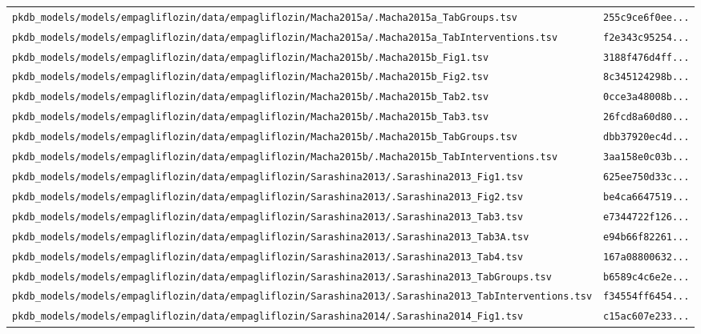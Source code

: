 \documentclass{article}
\begin{document}
\begin{longtable}{ll}
\texttt{pkdb\_models/models/empagliflozin/data/empagliflozin/Macha2015a/.Macha2015a\_TabGroups.tsv} & \texttt{255c9ce6f0ee...} \\
\texttt{pkdb\_models/models/empagliflozin/data/empagliflozin/Macha2015a/.Macha2015a\_TabInterventions.tsv} & \texttt{f2e343c95254...} \\
\texttt{pkdb\_models/models/empagliflozin/data/empagliflozin/Macha2015b/.Macha2015b\_Fig1.tsv} & \texttt{3188f476d4ff...} \\
\texttt{pkdb\_models/models/empagliflozin/data/empagliflozin/Macha2015b/.Macha2015b\_Fig2.tsv} & \texttt{8c345124298b...} \\
\texttt{pkdb\_models/models/empagliflozin/data/empagliflozin/Macha2015b/.Macha2015b\_Tab2.tsv} & \texttt{0cce3a48008b...} \\
\texttt{pkdb\_models/models/empagliflozin/data/empagliflozin/Macha2015b/.Macha2015b\_Tab3.tsv} & \texttt{26fcd8a60d80...} \\
\texttt{pkdb\_models/models/empagliflozin/data/empagliflozin/Macha2015b/.Macha2015b\_TabGroups.tsv} & \texttt{dbb37920ec4d...} \\
\texttt{pkdb\_models/models/empagliflozin/data/empagliflozin/Macha2015b/.Macha2015b\_TabInterventions.tsv} & \texttt{3aa158e0c03b...} \\
\texttt{pkdb\_models/models/empagliflozin/data/empagliflozin/Sarashina2013/.Sarashina2013\_Fig1.tsv} & \texttt{625ee750d33c...} \\
\texttt{pkdb\_models/models/empagliflozin/data/empagliflozin/Sarashina2013/.Sarashina2013\_Fig2.tsv} & \texttt{be4ca6647519...} \\
\texttt{pkdb\_models/models/empagliflozin/data/empagliflozin/Sarashina2013/.Sarashina2013\_Tab3.tsv} & \texttt{e7344722f126...} \\
\texttt{pkdb\_models/models/empagliflozin/data/empagliflozin/Sarashina2013/.Sarashina2013\_Tab3A.tsv} & \texttt{e94b66f82261...} \\
\texttt{pkdb\_models/models/empagliflozin/data/empagliflozin/Sarashina2013/.Sarashina2013\_Tab4.tsv} & \texttt{167a08800632...} \\
\texttt{pkdb\_models/models/empagliflozin/data/empagliflozin/Sarashina2013/.Sarashina2013\_TabGroups.tsv} & \texttt{b6589c4c6e2e...} \\
\texttt{pkdb\_models/models/empagliflozin/data/empagliflozin/Sarashina2013/.Sarashina2013\_TabInterventions.tsv} & \texttt{f34554ff6454...} \\
\texttt{pkdb\_models/models/empagliflozin/data/empagliflozin/Sarashina2014/.Sarashina2014\_Fig1.tsv} & \texttt{c15ac607e233...} \\

\end{longtable}
\end{document}
